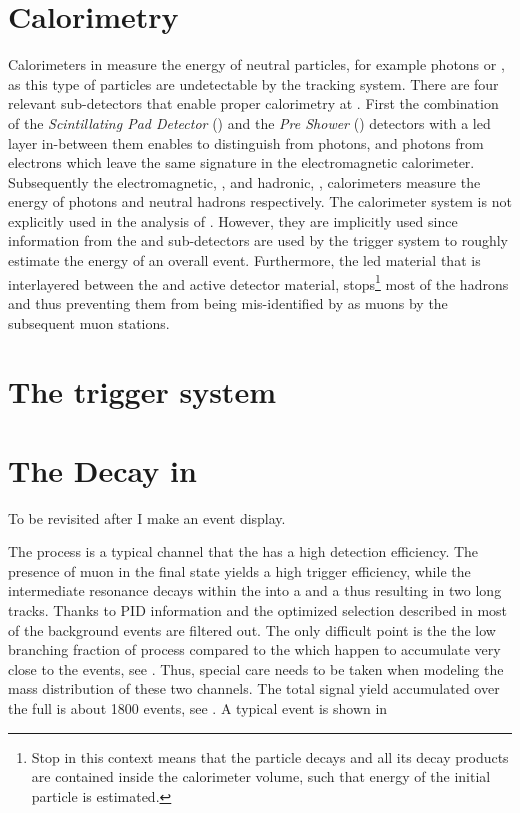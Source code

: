\section{Calorimetry}
\label{det_calo}
Calorimeters in \lhcb measure the energy of neutral particles, for example photons or \piz,
as this type of particles are undetectable by the tracking system. There are four relevant sub-detectors
that enable proper calorimetry at \lhcb. First the combination of the {\it Scintillating Pad Detector} (\spd)
and the {\it Pre Shower} (\presh) detectors with a led layer in-between them enables to distinguish \piz from
photons, and photons from electrons which leave the same signature in the electromagnetic calorimeter.
Subsequently the electromagnetic, \ecal, and hadronic, \hcal, calorimeters measure the energy of photons
and neutral hadrons respectively. The calorimeter system is not explicitly used in the analysis of .
However, they are implicitly used since information from the \spd and \presh sub-detectors are used
by the \lzero trigger system to roughly estimate the energy of an overall event. Furthermore, the
led material that is interlayered between the \ecal and \hcal active detector material, stops\footnote{Stop
in this context means that the particle decays and all its decay products are contained inside the calorimeter
volume, such that energy of the initial particle is estimated.} most of the hadrons and thus preventing them
from being mis-identified by as muons by the subsequent muon stations.

\section{The trigger system}
\label{det_trigger}


\section{The \BJpsiKst Decay in \lhcb}
\label{BspsiKst_at_lhcb}
{\color{red} To be revisited after I make an event display.}

The \BsJpsiKst process is a typical channel that the \lhcb has a high detection efficiency.
The presence of muon in the final state yields a high trigger efficiency, while the intermediate
\Kstar resonance decays within the \velo into a \kaon and a \pion thus resulting in two long tracks.
Thanks to PID information and the optimized selection described in  most of the background
events are filtered out. The only difficult point is the the low branching fraction of \BsJpsiKst process
compared to the \BdJpsiKst which happen to accumulate very close to the \BsJpsiKst events, see .
Thus, special care needs to be taken when modeling the mass distribution of these two channels.
The total \BsJpsiKst signal yield accumulated over the full \runone is about 1800 events, see .
A typical \BsJpsiKst event is  shown in 

